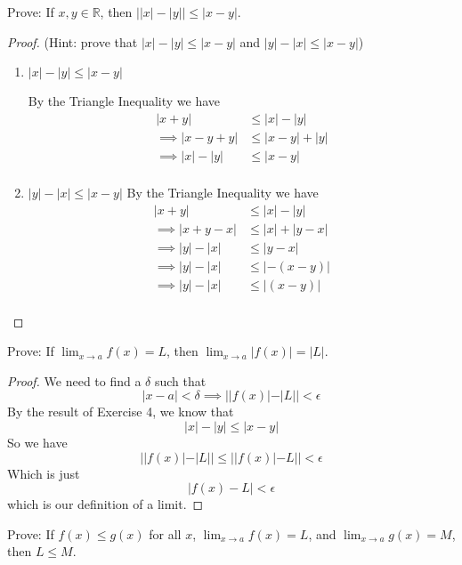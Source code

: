 \documentclass{article} %
\theoremstyle{plain}
\theoremstyle{definition}
\newcommand{\abs}[1]{\left\lvert #1 \right\rvert} %
\newcommand{\Rb}{\mathbb{R}}
\begin{document}
\newpage
\noindent{} Prove: If $x, y \in \Rb$, then $\abs{\abs{x}-\abs{y}} \leq \abs{x-y}$. 

\begin{proof} (Hint: prove that $\abs{x}-\abs{y} \leq \abs{x-y}$ and $\abs{y}-\abs{x} \leq \abs{x-y}$)
  \begin{enumerate}
    \item $\abs{x}-\abs{y} \leq \abs{x-y}$ 
      
      By the Triangle Inequality we have
      \begin{align*}
         |x+y| &\leq |x| - |y|  \\
         \implies |x-y+y| &\leq |x-y| + |y| \\
         \implies |x| - |y| &\leq |x-y| \\
      \end{align*}
    \item $\abs{y}-\abs{x} \leq \abs{x-y}$
      By the Triangle Inequality we have
      \begin{align*}
         |x+y| &\leq |x| - |y|  \\
         \implies |x+y-x| &\leq |x| + |y-x| \\
         \implies |y| - |x| &\leq |y-x| \\
         \implies |y| - |x| &\leq |-(x-y)| \\
         \implies |y| - |x| &\leq |(x-y)| \\
      \end{align*}
  \end{enumerate}
\end{proof} 


\newpage
\noindent{} Prove: If $\lim_{x \rightarrow a} f(x) = L$, then $\lim_{x \rightarrow a} \abs{f(x)} = \abs{L}$. 

\begin{proof} 
  We need to find a $\delta$ such that
    \[ |x-a| < \delta \implies ||f(x)| - |L|| < \epsilon \]
    By the result of Exercise 4, we know that
      \[ |x| - |y| \leq |x-y| \]
    So we have 
      \[ ||f(x)| - |L|| \leq ||f(x)| - L|| < \epsilon \]
    Which is just 
      \[ |f(x) - L| < \epsilon \]
    which is our definition of a limit.
\end{proof} 

\newpage
\noindent{} Prove: If $f(x) \leq g(x)$ for all $x$, $\lim_{x \rightarrow a} f(x)=L$, and $\lim_{x \rightarrow a} g(x)=M$, then $L \leq M$. 
\end{document}
